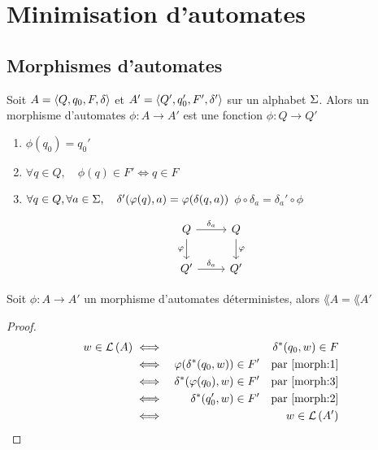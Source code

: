 \section{Minimisation d'automates}

\subsection{Morphismes d'automates}

\begin{definition}
	Soit $A = \langle Q, q_0, F, \delta \rangle$ et $ A' = \langle Q', q_0', F', \delta' \rangle $ sur un alphabet $\Sigma$.
	Alors un morphisme d'automates $\phi: A \to A'$ est une fonction $\phi: Q \to Q'$ \tlq
	\begin{enumerate}
		\item $\phi (q_0) = q_0'$ \label{morph:1}
		\item $\forall q \in Q,\quad  \phi (q) \in F' \iff q \in F$ \label{morph:2}
		\item $\forall q \in Q, \forall a \in \Sigma,\quad \delta'(\varphi (q), a) = \varphi (\delta(q,a))$ \ie $\phi \circ \delta_a = \delta_a '\circ \phi$ \label{morph:3}
	\end{enumerate}

	\[
		\begin{tikzcd}
			Q \arrow{r}{\delta_a} \arrow[swap]{d}{\phi} & Q \arrow{d}{\phi} \\
			Q' \arrow{r}{\delta_a} & Q'
		\end{tikzcd}
	\]

\end{definition}


\begin{exercice}
	Soit $\phi : A \to A'$ un morphisme d'automates déterministes, alors $\lang A = \lang {A'}$
\end{exercice}

\begin{proof}
	\begin{eqnarray*}
		w \in \mathcal{L}\left(A\right) &\iff& \delta^{*} (q_0, w) \in F \\
		&\iff& \varphi (\delta^{*} (q_0, w)) \in F' \quad \text{par } \ref{morph:1} \\
		&\iff& \delta^{*}( \varphi (q_0), w) \in F' \quad \text{par } \ref{morph:3} \\
		&\iff& \delta^{*}( q_0', w) \in F' \quad \text{par } \ref{morph:2} \\
		&\iff& w \in \mathcal{L}\left(A'\right)
	\end{eqnarray*}
\end{proof}


